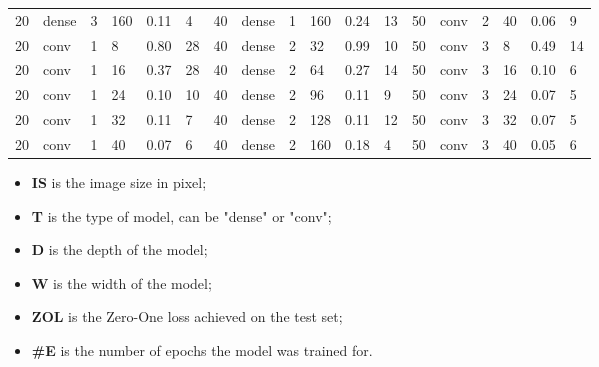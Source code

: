 \begin{table}
{\begin{tabular}{@{}llllll|llllll|llllll@{}}
20          & dense      & 3          & 160        & 0.11         & 4            & 40          & dense      & 1          & 160        & 0.24         & 13           & 50          & conv       & 2          & 40         & 0.06         & 9            \\
20          & conv       & 1          & 8          & 0.80         & 28           & 40          & dense      & 2          & 32         & 0.99         & 10           & 50          & conv       & 3          & 8          & 0.49         & 14           \\
20          & conv       & 1          & 16         & 0.37         & 28           & 40          & dense      & 2          & 64         & 0.27         & 14           & 50          & conv       & 3          & 16         & 0.10         & 6            \\
20          & conv       & 1          & 24         & 0.10         & 10           & 40          & dense      & 2          & 96         & 0.11         & 9            & 50          & conv       & 3          & 24         & 0.07         & 5            \\
20          & conv       & 1          & 32         & 0.11         & 7            & 40          & dense      & 2          & 128        & 0.11         & 12           & 50          & conv       & 3          & 32         & 0.07         & 5            \\
20          & conv       & 1          & 40         & 0.07         & 6            & 40          & dense      & 2          & 160        & 0.18         & 4            & 50          & conv       & 3          & 40         & 0.05         & 6            \\ \bottomrule
\end{tabular}}
\begin{itemize}
    \setlength\itemsep{0pt}
    \item[] \textbf{IS} is the image size in pixel;
    \item[] \textbf{T} is the type of model, can be "dense" or "conv";
    \item[] \textbf{D} is the depth of the model;
    \item[] \textbf{W} is the width of the model;
    \item[] \textbf{ZOL} is the Zero-One loss achieved on the test set;
    \item[] \textbf{\#E} is the number of epochs the model was trained for.
\end{itemize}
\end{table}
